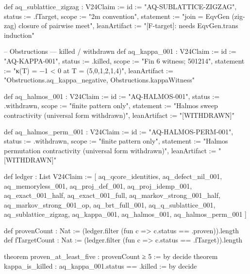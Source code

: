def aq_sublattice_zigzag : V24Claim :=
  { id := "AQ-SUBLATTICE-ZIGZAG", status := .fTarget, scope := "2m convention",
    statement := "join = EqvGen (zig-zag) closure of pairwise meet",
    leanArtifact := "[F-target]: needs EqvGen.trans induction" }

-- Obstructions — killed / withdrawn
def aq_kappa_001 : V24Claim :=
  { id := "AQ-KAPPA-001", status := .killed, scope := "Fin 6 witness; 501214",
    statement := "κ(T) = −1 < 0  at T = (5,0,1,2,1,4)",
    leanArtifact := "Obstructions.aq_kappa_negative, Obstructions.kappaWitness" }

def aq_halmos_001 : V24Claim :=
  { id := "AQ-HALMOS-001", status := .withdrawn, scope := "finite pattern only",
    statement := "Halmos sweep contractivity (universal form withdrawn)",
    leanArtifact := "[WITHDRAWN]" }

def aq_halmos_perm_001 : V24Claim :=
  { id := "AQ-HALMOS-PERM-001", status := .withdrawn, scope := "finite pattern only",
    statement := "Halmos permutation contractivity (universal form withdrawn)",
    leanArtifact := "[WITHDRAWN]" }

def ledger : List V24Claim :=
  [ aq_qcore_identities, aq_defect_nil_001, aq_memoryless_001,
    aq_proj_def_001, aq_proj_idemp_001,
    aq_exact_001_half, aq_exact_001_full,
    aq_markov_strong_001_half, aq_markov_strong_001_op,
    aq_brt_full_001, aq_q_sublattice_001, aq_sublattice_zigzag,
    aq_kappa_001, aq_halmos_001, aq_halmos_perm_001 ]

def provenCount : Nat := (ledger.filter (fun c => c.status == .proven)).length
def fTargetCount : Nat := (ledger.filter (fun c => c.status == .fTarget)).length

theorem proven_at_least_five : provenCount ≥ 5 := by decide
theorem kappa_is_killed : aq_kappa_001.status == .killed := by decide

